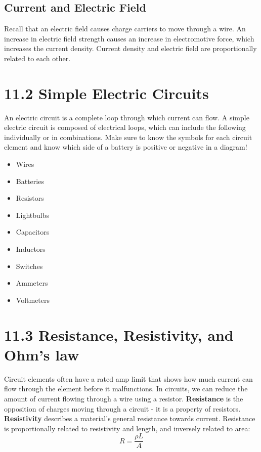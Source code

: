 \documentclass[12pt, titlepage]{article}
\begin{document}
\subsection*{Current and Electric Field}
Recall that an electric field causes charge carriers to move through a wire. An increase in electric field strength causes an increase in electromotive force, which increases the current density. Current density and electric field are proportionally related to each other.

\section*{11.2 Simple Electric Circuits}

An electric circuit is a complete loop through which current can flow. A simple electric circuit is composed of electrical loops, which can include the following individually or in combinations. Make sure to know the symbols for each circuit element and know which side of a battery is positive or negative in a diagram! 
\begin{multicols}{2}
    \begin{itemize}
        \item Wires
        \item Batteries
        \item Resistors
        \item Lightbulbs
        \item Capacitors
        \item Inductors
        \item Switches
        \item Ammeters
        \item Voltmeters
    \end{itemize}
\end{multicols}

\section*{11.3 Resistance, Resistivity, and Ohm's law}

 Circuit elements often have a rated amp limit that shows how much current can flow through the element before it malfunctions. In circuits, we can reduce the amount of current flowing through a wire using a resistor.\textbf{ Resistance} is the opposition of charges moving through a circuit - it is a property of resistors. \textbf{Resistivity} describes a material's general resistance towards current. Resistance is proportionally related to resistivity and length, and inversely related to area: 
 \begin{equation*}
    R = \frac{\rho L}{A}
 \end{equation*}
\end{document}
